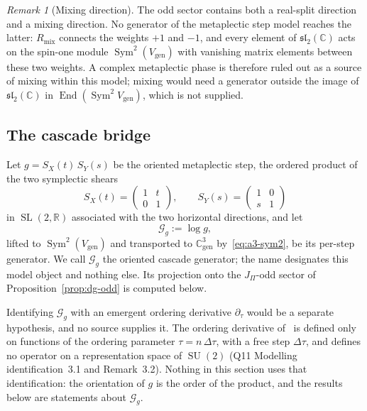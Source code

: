 \documentclass[11pt,a4paper]{article}
\theoremstyle{definition}
\theoremstyle{remark}
\newtheorem{remark}[theorem]{Remark}
\DeclareMathOperator{\Sym}{Sym}
\DeclareMathOperator{\End}{End}
\newcommand{\SL}{\operatorname{SL}}
\newcommand{\SU}{\operatorname{SU}}
\begin{document}
    \begin{remark}[Mixing direction]
      \label{rem:dg-mixing}
      The odd sector contains both a real-split direction and a mixing direction.
      No generator of the metaplectic step model reaches the latter: $R_{\mathrm{mix}}$ connects the
      weights $+1$ and $-1$, and every element of $\mathfrak{sl}_2(\mathbb{C})$ acts on the spin-one module
      $\Sym^2(V_{\mathrm{gen}})$ with vanishing matrix elements between these two weights.
      A complex metaplectic phase is therefore ruled out as a source of mixing within this model; mixing
      would need a generator outside the image of $\mathfrak{sl}_2(\mathbb{C})$ in
      $\End(\Sym^2 V_{\mathrm{gen}})$, which is not supplied.
    \end{remark}

  \subsection{The cascade bridge}
    \label{ssec:dg-bridge}

    Let $g = S_X(t)\, S_Y(s)$ be the oriented metaplectic step, the ordered product of the two
    symplectic shears
    \[
      S_X(t) = \begin{pmatrix} 1 & t \\ 0 & 1 \end{pmatrix},
      \qquad
      S_Y(s) = \begin{pmatrix} 1 & 0 \\ s & 1 \end{pmatrix}
    \]
    in $\SL(2,\mathbb{R})$ associated with the two horizontal directions, and let
    \[
      \mathcal{G}_g := \log g ,
    \]
    lifted to $\Sym^2(V_{\mathrm{gen}})$ and transported to $\mathbb{C}^3_{\mathrm{gen}}$ by~\eqref{eq:a3-sym2}, be
    its per-step generator.
    We call $\mathcal{G}_g$ the oriented cascade generator; the name designates this model object
    and nothing else.
    Its projection onto the $J_\Pi$-odd sector of Proposition~\ref{prop:dg-odd} is computed below.

    Identifying $\mathcal{G}_g$ with an emergent ordering derivative $\partial_\tau$ would be a
    separate hypothesis, and no source supplies it.
    The ordering derivative of~\cite{Beau2026q11} is defined only on functions of the ordering
    parameter $\tau = n\,\Delta\tau$, with a free step $\Delta\tau$, and defines no operator on a
    representation space of $\SU(2)$ (Q11 Modelling identification~3.1 and Remark~3.2).
    Nothing in this section uses that identification: the orientation of $g$ is the order of the
    product, and the results below are statements about $\mathcal{G}_g$.
\end{document}
